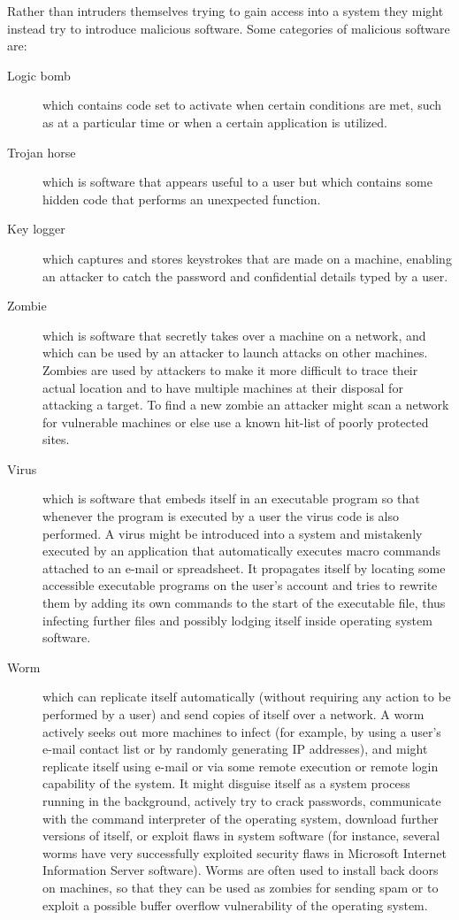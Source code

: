 Rather than intruders themselves trying to gain access into a system they
might instead try to introduce malicious software.
Some categories of malicious software are:
\begin{description}
  \item[Logic bomb] which contains code set to activate when certain conditions are
  met, such as at a particular time or when a certain application is utilized.
  \item[Trojan horse] which is software that appears useful to a user but which
  contains some hidden code that performs an unexpected function.
  \item[Key logger] which captures and stores keystrokes that are made on a machine,
  enabling an attacker to catch the password and confidential details typed by a user.
  \item[Zombie] which is software that secretly takes over a machine on a network,
  and which can be used by an attacker to launch attacks on other machines.
  Zombies are used by attackers to make it more difficult to trace their
  actual location and to have multiple machines at their disposal for attacking a target.
  To find a new zombie an attacker might scan a network for vulnerable machines or else
  use a known hit-list of poorly protected sites.
  \item[Virus] which is software that embeds itself in an executable program
  so that whenever the program is executed by a user the virus code is also performed.
  A virus might be introduced into a system and mistakenly executed by an
  application that automatically executes macro commands attached to an e-mail or spreadsheet.
  It propagates itself by locating some accessible executable programs on the user's
  account and tries to rewrite them by adding its own commands to the start
  of the executable file, thus infecting further files and possibly
  lodging itself inside operating system software.
  \item[Worm] which can replicate itself automatically (without requiring any action
  to be performed by a user) and send copies of itself over a network.
  A worm actively seeks out more machines to infect (for example, by using a
  user's e-mail contact list or by randomly generating IP addresses),
  and might replicate itself using e-mail
  or via some remote execution or remote login capability of the system.
  It might disguise itself as a system process running in the background,
  actively try to crack passwords, communicate with the command interpreter of the
  operating system, download further versions of itself,
  or exploit flaws in system software
  (for instance, several worms have very successfully exploited security flaws
  in Microsoft Internet Information Server software).
  Worms are often used to install back doors on machines, so that they can be used as zombies
  for sending spam or to exploit a possible buffer overflow vulnerability of the operating system.
\end{description}
